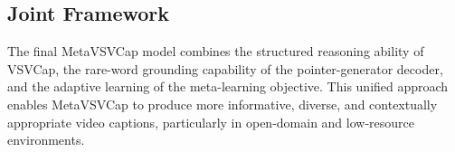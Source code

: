 \documentclass[journal]{IEEEtran}
\begin{document}
\subsection{Joint Framework}

The final MetaVSVCap model combines the structured reasoning ability of VSVCap, the rare-word grounding capability of the pointer-generator decoder, and the adaptive learning of the meta-learning objective. This unified approach enables MetaVSVCap to produce more informative, diverse, and contextually appropriate video captions, particularly in open-domain and low-resource environments.




\end{document}
